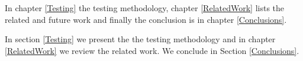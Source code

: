 In chapter \ref{Testing} the testing methodology, chapter \ref{RelatedWork} lists the related and future work and finally the conclusion is in chapter \ref{Conclusions}.

In section \ref{Testing} we present the the testing methodology and in chapter \ref{RelatedWork} we review the related work. We conclude in Section \ref{Conclusions}.




